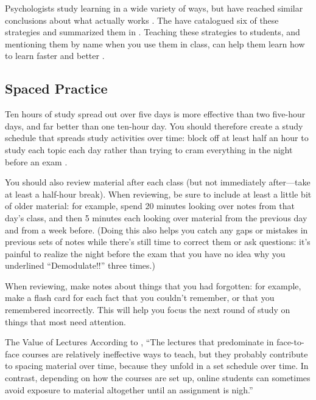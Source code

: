 
Psychologists study learning in a wide variety of ways, but have
reached similar conclusions about what actually works
\cite{Mark2018}. The 
have catalogued six of these strategies and summarized them in . Teaching
these strategies to students, and mentioning them by name when you use
them in class, can help them learn how to learn faster and better
\cite{Wein2018a}.

\subsection*{Spaced Practice}

Ten hours of study spread out over five days is more effective than two
five-hour days, and far better than one ten-hour day. You should
therefore create a study schedule that spreads study activities over
time: block off at least half an hour to study each topic each day
rather than trying to cram everything in the night before an exam
\cite{Kang2016}.

You should also review material after each class (but not immediately
after---take at least a half-hour break). When reviewing, be sure to
include at least a little bit of older material: for example, spend 20
minutes looking over notes from that day's class, and then 5 minutes
each looking over material from the previous day and from a week before.
(Doing this also helps you catch any gaps or mistakes in previous sets
of notes while there's still time to correct them or ask questions: it's
painful to realize the night before the exam that you have no idea why
you underlined ``Demodulate!!'' three times.)

When reviewing, make notes about things that you had forgotten: for
example, make a flash card for each fact that you couldn't remember, or
that you remembered incorrectly. This will help you focus the next round
of study on things that most need attention.

\begin{aside}{The Value of Lectures}
  According to \cite{Mill2016a}, ``The lectures that predominate in
  face-to-face courses are relatively ineffective ways to teach, but
  they probably contribute to spacing material over time, because they
  unfold in a set schedule over time. In contrast, depending on how the
  courses are set up, online students can sometimes avoid exposure to
  material altogether until an assignment is nigh.''
\end{aside}

